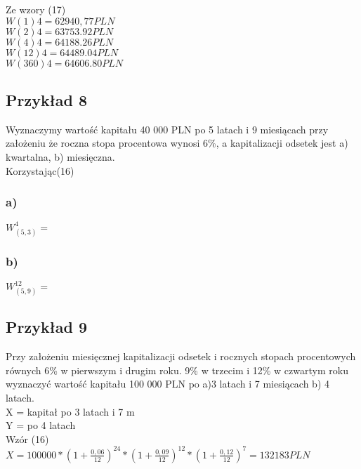 \documentclass{article}
\begin{document}
Ze wzory (17)\\

$ W(1)4 = 62 940,77 PLN $\\ 

$ W(2)4 = 63 753.92 PLN $\\

$ W(4)4 = 64 188.26 PLN $\\

$ W(12)4 = 64 489.04 PLN $\\

$ W(360)4 = 64 606.80 PLN $\\

\subsection{Przykład 8}
Wyznaczymy wartość kapitału 40 000 PLN po 5 latach i 9 miesiącach przy założeniu że roczna stopa procentowa wynosi 6\%, a kapitalizacji odsetek jest a) kwartalna, b) miesięczna.\\

Korzystając(16)\\

\subsubsection{a)}
$ W^4_{(5, 3)} = $
\subsubsection{b)}
$ W^{12}_{(5, 9)} = $

\subsection{Przykład 9}
Przy założeniu miesięcznej kapitalizacji odsetek i rocznych stopach procentowych równych 6\% w pierwszym i drugim roku. 9\% w trzecim i 12\% w czwartym roku wyznaczyć wartość kapitału 100 000 PLN po a)3 latach i 7 miesiącach b) 4 latach.\\

X = kapitał po 3 latach i 7 m\\ 

Y = po 4 latach\\

Wzór (16)\\

$ X = 100 000 * (1+\frac{0,06}{12})^{24} * (1+\frac{0,09}{12})^{12} * (1+\frac{0,12}{12})^7 = 132 183 PLN $\\
\end{document}
